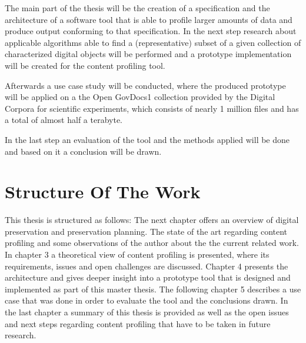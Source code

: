 The main part of the thesis will be the creation of a specification and the architecture of a software tool that is able to profile larger amounts of data and produce output conforming to that specification. In the next step research about applicable algorithms able to find a (representative) subset of a given collection of characterized digital objects will be performed and a prototype implementation will be created for the content profiling tool. 

Afterwards a use case study will be conducted, where the produced prototype will be applied on a the Open GovDocs1 collection provided by the Digital Corpora for scientific experiments, which consists of nearly 1 million files and has a total of almost half a terabyte. 

In the last step an evaluation of the tool and the methods applied will be done and based on it a conclusion will be drawn.

\section{Structure Of The Work}
This thesis is structured as follows: The next chapter offers an overview of digital preservation and preservation planning. The state of the art regarding content profiling and some observations of the author about the the current related work. In chapter 3 a theoretical view of content profiling is presented, where its requirements, issues and open challenges are discussed. Chapter 4 presents the architecture and gives deeper insight into a prototype tool that is designed and implemented as part of this master thesis. The following chapter 5 describes a use case that was done in order to evaluate the tool and the conclusions drawn. In the last chapter a summary of this thesis is provided as well as the open issues and next steps regarding content profiling that have to be taken in future research.